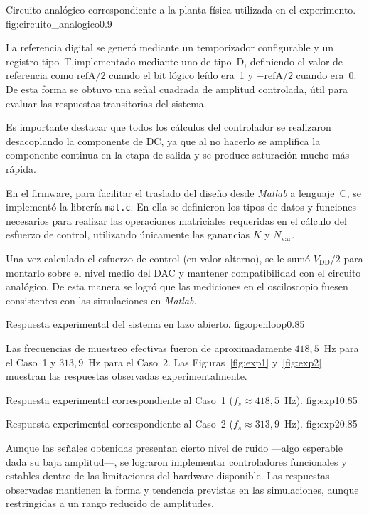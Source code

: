 {Circuito analógico correspondiente a la planta física utilizada en el experimento.}
{fig:circuito_analogico}{0.9}

La referencia digital se generó mediante un temporizador configurable 
y un registro tipo~T,implementado mediante uno de tipo~D, definiendo el valor de referencia como $\mathrm{refA}/2$ 
cuando el bit lógico leído era~1 y $-\mathrm{refA}/2$ cuando era~0. 
De esta forma se obtuvo una señal cuadrada de amplitud controlada, 
útil para evaluar las respuestas transitorias del sistema.

Es importante destacar que todos los cálculos del controlador se realizaron 
desacoplando la componente de \textsc{DC}, 
ya que al no hacerlo se amplifica la componente continua en la etapa de salida 
y se produce saturación mucho más rápida.

En el firmware, para facilitar el traslado del diseño desde \textit{Matlab} a lenguaje~C, 
se implementó la librería \texttt{mat.c}. 
En ella se definieron los tipos de datos y funciones necesarios para realizar las operaciones matriciales requeridas en el cálculo del esfuerzo de control, 
utilizando únicamente las ganancias $K$ y $N_{\mathrm{var}}$.

Una vez calculado el esfuerzo de control (en valor alterno), 
se le sumó $V_{\mathrm{DD}}/2$ para montarlo sobre el nivel medio del DAC 
y mantener compatibilidad con el circuito analógico. 
De esta manera se logró que las mediciones en el osciloscopio 
fuesen consistentes con las simulaciones en \textit{Matlab}.

{Respuesta experimental del sistema en lazo abierto.}
{fig:openloop}{0.85}

Las frecuencias de muestreo efectivas fueron de aproximadamente 
$418{,}5$~Hz para el Caso~1 y $313{,}9$~Hz para el Caso~2. 
Las Figuras~\ref{fig:exp1} y~\ref{fig:exp2} muestran las respuestas observadas experimentalmente.

{Respuesta experimental correspondiente al Caso~1 ($f_s \approx 418{,}5$~Hz).}
{fig:exp1}{0.85}

{Respuesta experimental correspondiente al Caso~2 ($f_s \approx 313{,}9$~Hz).}
{fig:exp2}{0.85}

Aunque las señales obtenidas presentan cierto nivel de ruido —algo esperable dada su baja amplitud—, 
se lograron implementar controladores funcionales y estables dentro de las limitaciones del hardware disponible. 
Las respuestas observadas mantienen la forma y tendencia previstas en las simulaciones, 
aunque restringidas a un rango reducido de amplitudes.


